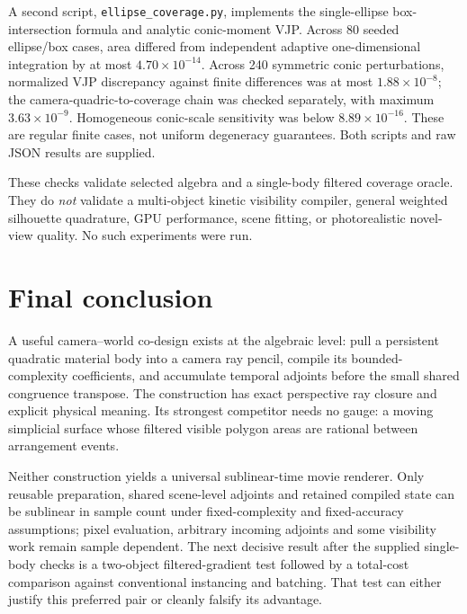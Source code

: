 \documentclass[10pt,letterpaper]{article}
\theoremstyle{remark}\newtheorem{counterexample}[proposition]{Counterexample}
\begin{document}
A second script, \texttt{ellipse\_coverage.py}, implements the single-ellipse box-intersection formula and analytic conic-moment VJP. Across 80 seeded ellipse/box cases, area differed from independent adaptive one-dimensional integration by at most $4.70\times10^{-14}$. Across 240 symmetric conic perturbations, normalized VJP discrepancy against finite differences was at most $1.88\times10^{-8}$; the camera-quadric-to-coverage chain was checked separately, with maximum $3.63\times10^{-9}$. Homogeneous conic-scale sensitivity was below $8.89\times10^{-16}$. These are regular finite cases, not uniform degeneracy guarantees. Both scripts and raw JSON results are supplied.

These checks validate selected algebra and a single-body filtered coverage oracle. They do \emph{not} validate a multi-object kinetic visibility compiler, general weighted silhouette quadrature, GPU performance, scene fitting, or photorealistic novel-view quality. No such experiments were run.

\section*{Final conclusion}
A useful camera--world co-design exists at the algebraic level: pull a persistent quadratic material body into a camera ray pencil, compile its bounded-complexity coefficients, and accumulate temporal adjoints before the small shared congruence transpose. The construction has exact perspective ray closure and explicit physical meaning. Its strongest competitor needs no gauge: a moving simplicial surface whose filtered visible polygon areas are rational between arrangement events.

Neither construction yields a universal sublinear-time movie renderer. Only reusable preparation, shared scene-level adjoints and retained compiled state can be sublinear in sample count under fixed-complexity and fixed-accuracy assumptions; pixel evaluation, arbitrary incoming adjoints and some visibility work remain sample dependent. The next decisive result after the supplied single-body checks is a two-object filtered-gradient test followed by a total-cost comparison against conventional instancing and batching. That test can either justify this preferred pair or cleanly falsify its advantage.
\end{document}
